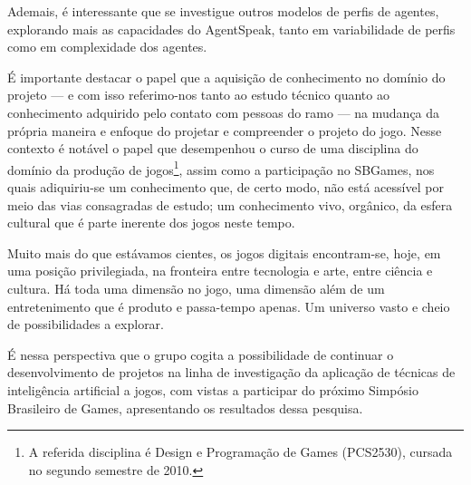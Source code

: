 Ademais, é interessante que se investigue outros modelos de perfis de agentes, explorando mais as capacidades do AgentSpeak, tanto em variabilidade de perfis como em complexidade dos agentes.



É importante destacar o papel que a aquisição de conhecimento no domínio do projeto --- e com isso referimo-nos tanto ao estudo técnico quanto ao conhecimento adquirido pelo contato com pessoas do ramo --- na mudança da própria maneira e enfoque do projetar e compreender o projeto do jogo. Nesse contexto é notável o papel que desempenhou o curso de uma disciplina do domínio da produção de jogos\footnote{A referida disciplina é Design e Programação de Games  (\textsc{PCS2530}), cursada no segundo semestre de 2010.}, assim como a participação no SBGames, nos quais adiquiriu-se um conhecimento
que, de certo modo, não está acessível por meio das vias consagradas de estudo; um conhecimento vivo, orgânico, da esfera cultural que é parte inerente dos jogos neste tempo.

Muito mais do que estávamos cientes, os jogos digitais encontram-se, hoje, em uma posição
privilegiada, na fronteira entre tecnologia e arte, entre ciência e
cultura. Há toda uma dimensão no jogo, uma dimensão além de um
entretenimento que é produto e passa-tempo apenas. Um universo vasto e cheio de possibilidades a explorar.

É nessa perspectiva que o grupo cogita a possibilidade de continuar o desenvolvimento de projetos na linha de investigação da aplicação de técnicas de inteligência artificial a jogos, com vistas a participar do próximo Simpósio Brasileiro de Games, apresentando os resultados dessa pesquisa.
